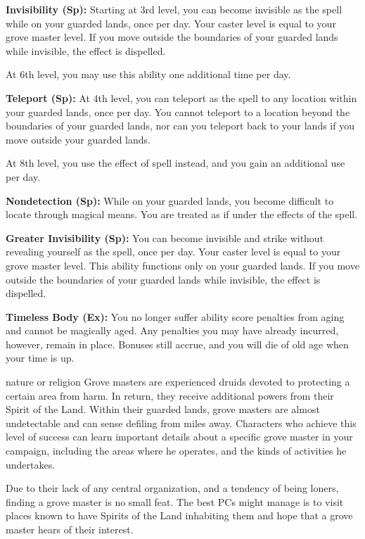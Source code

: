 {\textbf{Invisibility (Sp):} Starting at 3rd level, you can become invisible as the  spell while on your guarded lands, once per day. Your caster level is equal to your grove master level. If you move outside the boundaries of your guarded lands while invisible, the effect is dispelled.

At 6th level, you may use this ability one additional time per day.

\textbf{Teleport (Sp):} At 4th level, you can teleport as the  spell to any location within your guarded lands, once per day. You cannot teleport to a location beyond the boundaries of your guarded lands, nor can you teleport back to your lands if you move outside your guarded lands.

At 8th level, you use the effect of  spell instead, and you gain an additional use per day.

\textbf{Nondetection (Sp):} While on your guarded lands, you become difficult to locate through magical means. You are treated as if under the effects of the  spell.

\textbf{Greater Invisibility (Sp):} You can become invisible and strike without revealing yourself as the  spell, once per day. Your caster level is equal to your grove master level. This ability functions only on your guarded lands. If you move outside the boundaries of your guarded lands while invisible, the effect is dispelled.

\textbf{Timeless Body (Ex):} You no longer suffer ability score penalties from aging and cannot be magically aged. Any penalties you may have already incurred, however, remain in place. Bonuses still accrue, and you will die of old age when your time is up.
}
{}
{nature or religion}
{Grove masters are experienced druids devoted to protecting a certain area from harm. In return, they receive additional powers from their Spirit of the Land.}
{Within their guarded lands, grove masters are almost undetectable and can sense defiling from miles away.}
{Characters who achieve this level of success can learn important details about a specific grove master in your campaign, including the areas where he operates, and the kinds of activities he undertakes.}

Due to their lack of any central organization, and a tendency of being loners, finding a grove master is no small feat. The best PCs might manage is to visit places known to have Spirits of the Land inhabiting them and hope that a grove master hears of their interest.